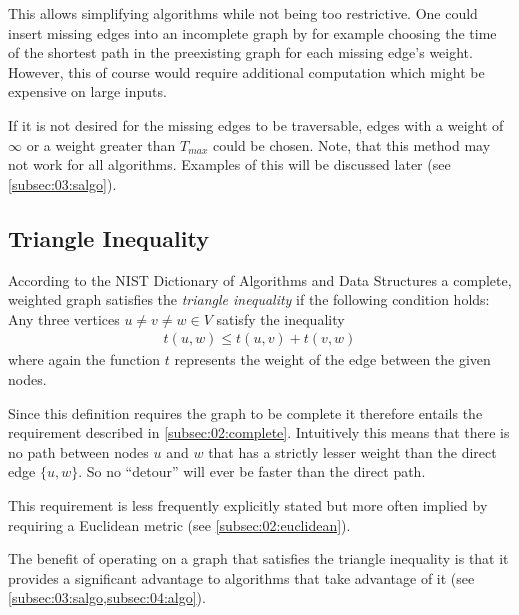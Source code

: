 This allows simplifying algorithms while not being too restrictive.
One could insert missing edges into an incomplete graph by for example choosing the time of the shortest path in the preexisting graph for each missing edge's weight.
However, this of course would require additional computation which might be expensive on large inputs.

If it is not desired for the missing edges to be traversable,
edges with a weight of $\infty$ or a weight greater than $T_{max}$ could be chosen.
Note, that this method may not work for all algorithms. Examples of this will be discussed later (see \cref{subsec:03:salgo}).

\subsection{Triangle Inequality}
\label{subsec:02:triangle}

According to the NIST Dictionary of Algorithms and Data Structures \cite{black_triangle_2004} a complete,
weighted graph satisfies the \emph{triangle inequality} if the following condition holds:
Any three vertices $u \neq v \neq w \in V$ satisfy the inequality
\begin{align*}
	t(u, w) \leq t(u, v) + t(v, w)
\end{align*}
where again the function $t$ represents the weight of the edge between the given nodes.

Since this definition requires the graph to be complete it therefore entails the requirement described in \cref{subsec:02:complete}.
Intuitively this means that there is no path between nodes $u$ and $w$ that has a strictly lesser weight
than the direct edge $\{u, w\}$. So no \enquote{detour} will ever be faster than the direct path.

This requirement is less frequently explicitly stated \cite{santini_hazardous_2022} but more often implied by requiring a Euclidean metric (see \cref{subsec:02:euclidean}).

The benefit of operating on a graph that satisfies the triangle inequality
is that it provides a significant advantage to algorithms that take advantage of it
(see \cref{subsec:03:salgo,subsec:04:algo}).


